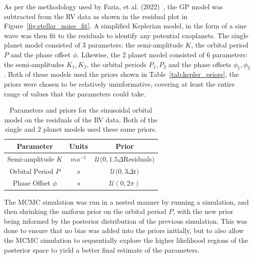 As per the methodology used by Faria, et al. (2022)~\cite{faria2022}, the GP model was subtracted from the RV data as shown
in the residual plot in Figure~\eqref{fig:stellar_noise_fit}.
A simplified Keplerian model, in the form of a sine wave was then fit to the residuals to identify any potential exoplanets.
The single planet model consisted of 3 parameters: the semi-amplitude $K$, the orbital period $P$ and the phase offset $\phi$.
Likewise, the 2 planet model consisted of 6 parameters: the semi-amplitudes $K_{1}, K_{2}$, the orbital periods $P_{1}, P_{2}$
and the phase offsets $\phi_{1}, \phi_{2}$.
Both of these models used the priors shown in Table~\eqref{tab:kepler_priors}, the priors were chosen to be relatively
uninformative, covering at least the entire range of values that the parameters could take.

\begin{table}[htb]
    \centering
    \begin{tabular}{ccc}
        \toprule
        \toprule
        Parameter & Units & Prior \\
        \midrule
        Semi-amplitude $K$ & $ms^{-1}$ & $\mathcal{U}(0, 1.5 \Delta$Residuals$)$ \\
        \addlinespace
        Orbital Period $P$ & $s$ & $\mathcal{U}(0, 3 \Delta$t$)$  \\
        \addlinespace
        Phase Offset $\phi$ & $s$ & $\mathcal{U}(0, 2\pi)$ \\
        \bottomrule
    \end{tabular}
    \caption{Parameters and priors for the sinusoidal orbital model on the residuals of the RV data.
    Both of the single and 2 planet models used these same priors.}
    \label{tab:kepler_priors}
\end{table}

The MCMC simulation was run in a nested manner by running a simulation, and then shrinking the uniform prior on the orbital
period $P$, with the new prior being informed by the posterior distribution of the previous simulation.
This was done to ensure that no bias was added into the priors initially, but to also allow the MCMC simulation to sequentially
explore the higher likelihood regions of the posterior space to yield a better final estimate of the parameters.

